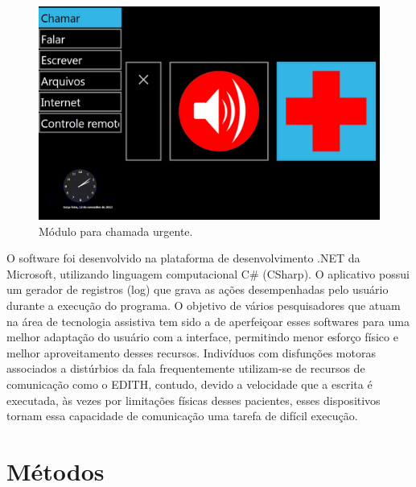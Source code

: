 \documentclass[twoside]{article}
\begin{document}
\begin{multicols}{2}
\begin{figure}[H]
\label{fig:edith_chamar}
  \caption{Módulo para chamada urgente.}
  \centering
    \includegraphics[scale = 0.19]{edith_chamar.png}
\end{figure}

\noindent O software foi desenvolvido na plataforma de desenvolvimento .NET da Microsoft, utilizando linguagem computacional C\# (CSharp). O aplicativo possui um gerador de registros (log) que grava as ações desempenhadas pelo usuário durante a execução do programa. O objetivo de vários pesquisadores que atuam na área de tecnologia assistiva tem sido a de aperfeiçoar esses softwares para uma melhor adaptação do usuário com a interface, permitindo menor esforço físico e melhor aproveitamento desses recursos. Indivíduos com disfunções motoras associados a distúrbios da fala frequentemente utilizam-se de recursos de comunicação como o EDITH, contudo, devido a velocidade que a escrita é executada, às vezes por limitações físicas desses pacientes, esses dispositivos tornam essa capacidade de comunicação uma tarefa de difícil execução. 

\section{Métodos}


\end{multicols}
\end{document}
